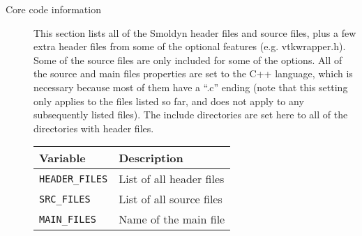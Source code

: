 \documentclass {scrbook}
\newcommand {\ttt} {\texttt}
\begin{document}
\begin{description}
\item[Core code information]
This section lists all of the Smoldyn header files and source files, plus a few extra header files from some of the optional features (e.g. vtkwrapper.h). Some of the source files are only included for some of the options. All of the source and main files properties are set to the C++ language, which is necessary because most of them have a ``.c'' ending (note that this setting only applies to the files listed so far, and does not apply to any subsequently listed files). The include directories are set here to all of the directories with header files.
\begin{longtable}[c]{ll}
Variable & Description\\
\hline
\ttt{HEADER\_FILES} & List of all header files\\
\ttt{SRC\_FILES} & List of all source files\\
\ttt{MAIN\_FILES} & Name of the main file\\
\end{longtable}


\end{description}
\end{document}
